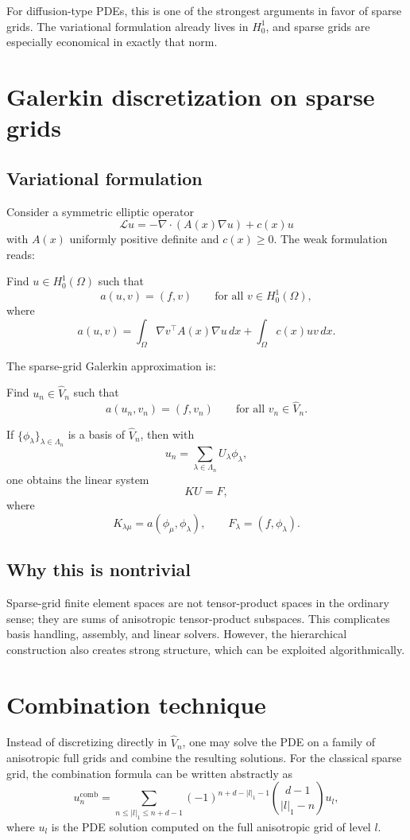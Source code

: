 \documentclass[11pt,a4paper]{report}
\begin{document}
For diffusion-type PDEs, this is one of the strongest arguments in favor of sparse grids. The variational formulation already lives in $H_0^1$, and sparse grids are especially economical in exactly that norm.

\section{Galerkin discretization on sparse grids}

\subsection{Variational formulation}

Consider a symmetric elliptic operator
$$
\mathcal{L}u = -\nabla\cdot (A(x)\nabla u) + c(x)u
$$
with $A(x)$ uniformly positive definite and $c(x)\ge 0$. The weak formulation reads:

Find $u\in H_0^1(\Omega)$ such that
$$
a(u,v) = (f,v)
\qquad\text{for all } v\in H_0^1(\Omega),
$$
where
$$
a(u,v) = \int_\Omega \nabla v^\top A(x)\nabla u\,dx + \int_\Omega c(x)uv\,dx.
$$

The sparse-grid Galerkin approximation is:

Find $u_n\in \widehat V_n$ such that
$$
a(u_n,v_n) = (f,v_n)
\qquad\text{for all } v_n\in \widehat V_n.
$$

If $\{\phi_\lambda\}_{\lambda\in\Lambda_n}$ is a basis of $\widehat V_n$, then with
$$
u_n = \sum_{\lambda\in\Lambda_n} U_\lambda \phi_\lambda,
$$
one obtains the linear system
$$
K U = F,
$$
where
$$
K_{\lambda\mu} = a(\phi_\mu,\phi_\lambda),
\qquad
F_\lambda = (f,\phi_\lambda).
$$

\subsection{Why this is nontrivial}

Sparse-grid finite element spaces are not tensor-product spaces in the ordinary sense; they are sums of anisotropic tensor-product subspaces. This complicates basis handling, assembly, and linear solvers. However, the hierarchical construction also creates strong structure, which can be exploited algorithmically.

\section{Combination technique}

Instead of discretizing directly in $\widehat V_n$, one may solve the PDE on a family of anisotropic full grids and combine the resulting solutions. For the classical sparse grid, the combination formula can be written abstractly as
$$
u_n^{\mathrm{comb}}
=
\sum_{n\le |l|_1\le n+d-1}
(-1)^{n+d-|l|_1-1}
\binom{d-1}{|l|_1-n}
u_l,
$$
where $u_l$ is the PDE solution computed on the full anisotropic grid of level $l$.
\end{document}
